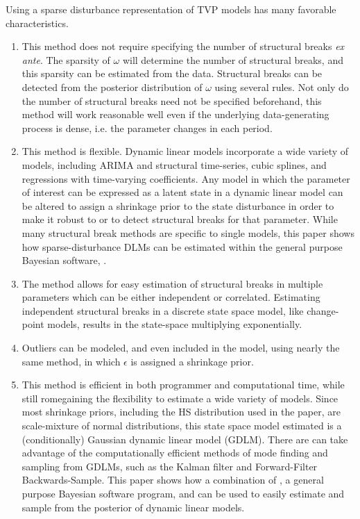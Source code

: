 Using a sparse disturbance representation of TVP models has many favorable characteristics.
\begin{enumerate}
\item This method does not require specifying the number of structural breaks \textit{ex ante}.
The sparsity of $\omega$ will determine the number of structural breaks, and this sparsity can be estimated from the data.
Structural breaks can be detected from the posterior distribution of $\omega$ using several rules.
Not only do the number of structural breaks need not be specified beforehand, this method will work reasonable well even if the underlying data-generating process is dense, i.e. the parameter changes in each period.
\item This method is flexible.
Dynamic linear models incorporate a wide variety of models, including ARIMA and structural time-series, cubic splines, and regressions with time-varying coefficients.
Any model in which the parameter of interest can be expressed as a latent state in a dynamic linear model can be altered to assign a shrinkage prior to the state disturbance in order to make it robust to or to detect structural breaks for that parameter.
While many structural break methods are specific to single models, this paper shows how sparse-disturbance DLMs can be estimated within the general purpose Bayesian software, \Stan{}.
\item The method allows for easy estimation of structural breaks in multiple parameters which can be either independent or correlated.
Estimating independent structural breaks in a discrete state space model, like change-point models, results in the state-space multiplying exponentially.
\item Outliers can be modeled, and even included in the model, using nearly the same method, in which $\epsilon$ is assigned a shrinkage prior.
\item This method is efficient in both programmer and computational time, while still romegaining the flexibility to estimate a wide variety of models.
Since most shrinkage priors, including the HS distribution used in the paper, are scale-mixture of normal distributions, this state space model estimated is a (conditionally) Gaussian dynamic linear model (GDLM). There are can take advantage of the computationally efficient methods of mode finding and sampling from GDLMs, such as the Kalman filter and Forward-Filter Backwards-Sample.
This paper shows how a combination of \Stan{}, a general purpose Bayesian software program, and \RLang{} can be used to easily estimate and sample from the posterior of dynamic linear models.
\end{enumerate}

